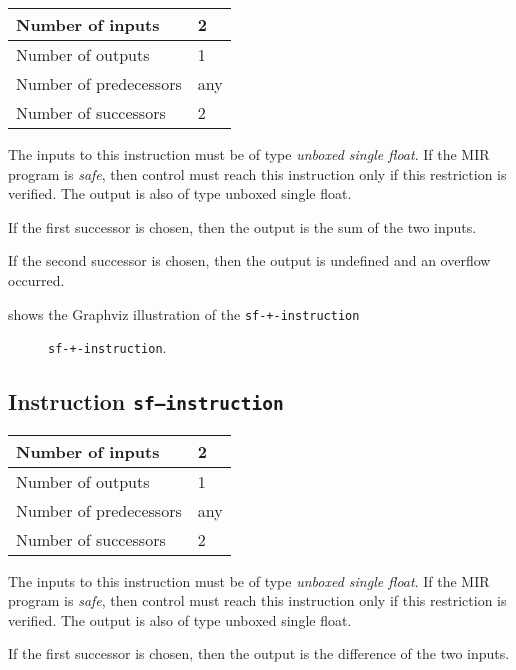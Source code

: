 \begin{tabular}{|l|l|}
\hline
Number of inputs & 2\\
\hline
Number of outputs & 1\\
\hline
Number of predecessors & any\\
\hline
Number of successors & 2\\
\hline
\end{tabular}

The inputs to this instruction must be of type \emph{unboxed single
  float}.  If the MIR program is \emph{safe}, then control must reach
this instruction only if this restriction is verified.  The output is
also of type unboxed single float.

If the first successor is chosen, then the output is
the sum of the two inputs.  

If the second successor is chosen, then the output is undefined and an
overflow occurred. 

 shows the Graphviz illustration of the
\texttt{sf-+-instruction}

\begin{figure}
\begin{center}
\end{center}
\caption{\label{fig-sf-+-instruction}
\texttt{sf-+-instruction}.}
\end{figure}

\subsection{Instruction \texttt{sf---instruction}}
\label{mir-instruction-sf--}

\begin{tabular}{|l|l|}
\hline
Number of inputs & 2\\
\hline
Number of outputs & 1\\
\hline
Number of predecessors & any\\
\hline
Number of successors & 2\\
\hline
\end{tabular}

The inputs to this instruction must be of type \emph{unboxed single
  float}.  If the MIR program is \emph{safe}, then control must reach
this instruction only if this restriction is verified.  The output is
also of type unboxed single float.

If the first successor is chosen, then the output is
the difference of the two inputs.  

